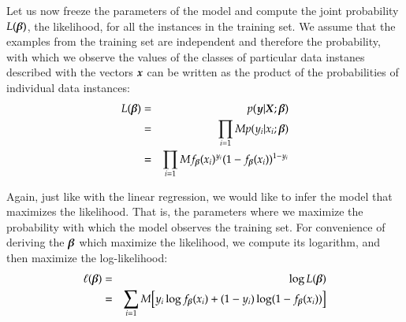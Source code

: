 \begin{refsection}
Let us now freeze the parameters of the model and compute the joint probability $L(\boldsymbol{\beta})$, the likelihood, for all the instances in the training set. We assume that the examples from the training set are independent and therefore the probability, with which we observe the values of the classes of particular data instanes described with the vectors $\boldsymbol{x}$ can be written as the product of the probabilities of individual data instances:
\begin{eqnarray}
  L(\boldsymbol{\beta}) & = & p(\boldsymbol{y}|\boldsymbol{X};\boldsymbol{\beta}) \nonumber\\
  & = & \prod_{i=1}M p(y_i|x_i;\boldsymbol{\beta}) \nonumber\\
  & = & \prod_{i=1}M f_{\boldsymbol{\beta}}(x_i)^{y_i}(1-f_{\boldsymbol{\beta}}(x_i))^{1-y_i}
\end{eqnarray}

Again, just like with the linear regression, we would like to infer the model that maximizes the likelihood. That is, the parameters where we maximize the probability with which the model observes the training set. For convenience of deriving the $\boldsymbol{\beta}$ which maximize the likelihood, we compute its logarithm, and then maximize the log-likelihood:
\begin{eqnarray}
  \ell(\boldsymbol{\beta}) & = & \log L(\boldsymbol{\beta}) \nonumber\\
  & = & \sum_{i=1}M\big[y_i\log f_{\boldsymbol{\beta}}(x_i)+(1-y_i)\log (1-f_{\boldsymbol{\beta}}(x_i)) \big]
\end{eqnarray}


\end{refsection}

